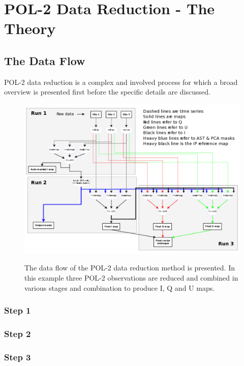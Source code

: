 \chapter{POL-2 Data Reduction - The Theory}
\label{sec:dr}
\section{The Data Flow}

POL-2 data reduction is a complex and involved process
for which a broad overview is presented first before
the specific details are discussed.


\begin{figure}[t!]
\begin{center}
\includegraphics[width=0.95\linewidth]{pol2-dr-flow.png}
\label{fig:pol2drflow}
\caption [POL-2 Data Flow]{
  \small The data flow of the POL-2 data reduction method is
  presented. In this example three POL-2 observations are
  reduced and combined in various stages and combination to
  produce I, Q and U maps.
}
\end{center}
\end{figure}

\subsection*{Step 1}

\subsection*{Step 2}

\subsection*{Step 3}



